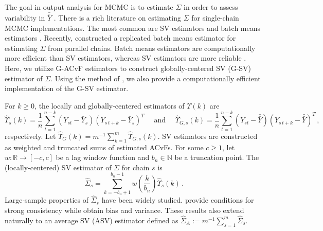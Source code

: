 \documentclass[12pt]{article}
\newcommand{\ds}{\displaystyle}
\theoremstyle{remark}
\begin{document}

%
The goal in output analysis for MCMC is to estimate $\Sigma$ in order to assess variability in $\bar{\bar{Y}}$ \citep{fleg:hara:jone:2008,roy:2019,vats:rob:fle:jon:2020}. There is a rich literature on estimating $\Sigma$ for single-chain MCMC implementations. The most common are SV estimators \citep{andr:1991,vats:fleg:jon:2018} and batch means estimators \citep{chen:seila:1987,vats:fleg:jon:2019}. Recently, \cite{gupta:vats:2020} constructed a replicated batch means estimator for estimating $\Sigma$ from parallel chains. Batch means estimators are computationally more efficient than SV estimators, whereas SV estimators are more reliable \citep{damerdji:1995,fleg:jone:2010}. Here, we utilize G-ACvF estimators to construct globally-centered SV (G-SV) estimator of $\Sigma$. Using the method of \cite{heberle2017fast}, we also provide a computationally efficient implementation of the G-SV estimator. 

For $k \geq 0$, the locally and globally-centered  estimators of $\Upsilon(k)$ are
\[
\hat{\Upsilon}_s(k) = \dfrac{1}{n} \ds \sum_{t=1}^{n - k} (Y_{st} - \bar{Y}_s)(Y_{s\,t+k} - \bar{Y}_s)^T \quad \text{ and } \quad \hat{\Upsilon}_{G,s}(k) = \dfrac{1}{n} \ds \sum_{t=1}^{n - k} (Y_{st} - \bar{\bar{Y}})(Y_{s\,t+k} - \bar{\bar{Y}})^T\,,
\] 
respectively. Let $\hat{\Upsilon}_G(k) = m^{-1} \sum_{k=1}^{m}\hat{\Upsilon}_{G,s}(k)$. SV estimators are constructed as weighted and truncated sums of estimated ACvFs. For some $c \geq 1$, let $w: \mathbb{R} \to [-c,c]$ be a lag window function and $b_n \in \mathbb{N}$ be a truncation point. The (locally-centered) SV estimator of $\Sigma$ for chain $s$ is
%
%
\begin{equation} \label{eq:sve}
    \hat{\Sigma}_{s} = \sum_{k=-b_n+1}^{b_n-1}w\left(\dfrac{k}{b_n}\right)\hat{\Upsilon}_s(k)\,.
\end{equation}
Large-sample properties of $\hat{\Sigma}_s$ have been widely studied. \cite{vats:fleg:jon:2018} provide conditions for strong consistency while \cite{fleg:jone:2010,hannan:1970} obtain bias and variance. These results also extend naturally to an average SV (ASV) estimator defined as $\hat{\Sigma}_A := m^{-1} \sum_{s=1}^{m}\hat{\Sigma}_{s}$.

\end{document}
